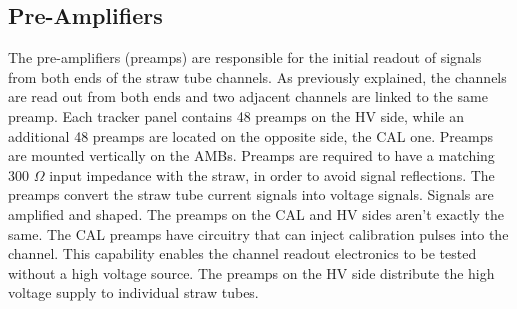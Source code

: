 \subsection{Pre-Amplifiers}
The pre-amplifiers (preamps) are responsible for the initial readout of 
signals from both ends of the straw tube channels. As previously explained, 
the channels are read out from both ends and two adjacent channels are linked 
to the same preamp. Each tracker panel contains 48 preamps on the HV side, 
while an additional 48 preamps are located on the opposite side, the CAL one. 
Preamps are mounted vertically on the AMBs. Preamps are required to have a 
matching 300 $\Omega$ input impedance with the straw, in order to avoid signal 
reflections. The preamps convert the straw tube current signals into voltage signals. 
Signals are amplified and shaped. The preamps on the CAL and HV sides aren't 
exactly the same. The CAL preamps have circuitry that can inject calibration 
pulses into the channel. This capability enables the channel readout electronics 
to be tested without a high voltage source. The preamps on the HV side distribute 
the high voltage supply to individual straw tubes. 
